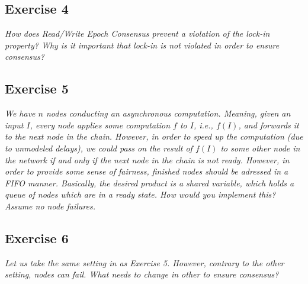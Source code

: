 \subsection*{Exercise 4}
\label{sec:exercise_4}

\emph{How does Read/Write Epoch Consensus prevent a violation of the lock-in property? Why is it important that lock-in is not violated in order to ensure consensus?}

\subsection*{Exercise 5}
\label{sec:exercise_5}

\emph{We have $n$ nodes conducting an asynchronous computation. Meaning, given an input $I$, every node applies some computation $f$ to $I$, i.e., $f(I)$, and forwards it to the next node in the chain. However, in order to speed up the computation (due to unmodeled delays), we could pass on the result of $f(I)$ to some other node in the network if and only if the next node in the chain is not ready. However, in order to provide some sense of fairness, finished nodes should be adressed in a FIFO manner. Basically, the desired product is a shared variable, which holds a queue of nodes which are in a ready state. How would you implement this? Assume no node failures.}

\subsection*{Exercise 6}
\label{sec:exercise_6}

\emph{Let us take the same setting in as Exercise 5. However, contrary to the other setting, nodes can fail. What needs to change in other to ensure consensus?}


